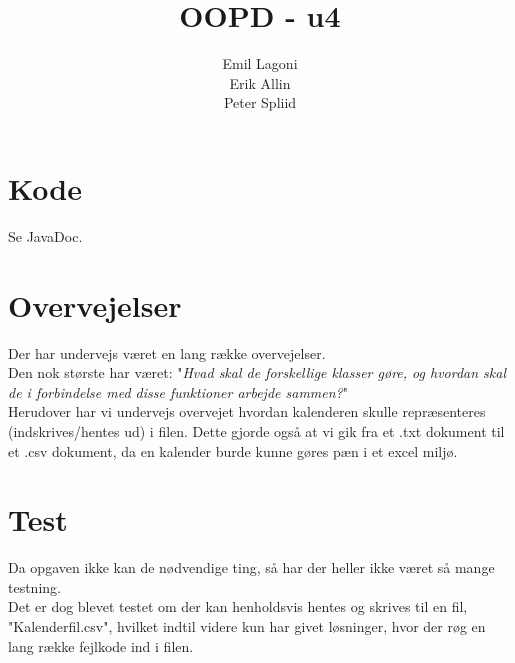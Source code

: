 \documentclass[a4paper,11pt]{article}
\title{\textbf{OOPD - u4}}
\author{Emil Lagoni\\Erik Allin\\Peter Spliid}
\begin{document}
\maketitle
\section*{Kode}
Se JavaDoc.


\section*{Overvejelser}
Der har undervejs været en lang række overvejelser. \\
Den nok største har været: "\textit{Hvad skal de forskellige klasser gøre, og hvordan skal de i forbindelse med disse funktioner arbejde sammen?}" \\
Herudover har vi undervejs overvejet hvordan kalenderen skulle repræsenteres (indskrives/hentes ud) i filen. Dette gjorde også at vi gik fra et .txt dokument til et .csv dokument, da en kalender burde kunne gøres pæn i et excel miljø.

\section*{Test}
Da opgaven ikke kan de nødvendige ting, så har der heller ikke været så mange testning. \\
Det er dog blevet testet om der kan henholdsvis hentes og skrives til en fil, "Kalenderfil.csv", hvilket indtil videre kun har givet løsninger, hvor der røg en lang række fejlkode ind i filen.
\end{document}
